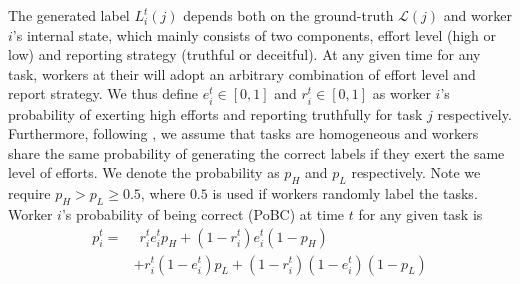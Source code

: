 The generated label $L^{t}_{i}(j)$ depends both on the ground-truth $\mathcal{L}(j)$ and worker $i$'s internal state, which mainly consists of two components, effort level (high or low) and reporting strategy (truthful or deceitful).
At any given time for any task, workers at their will adopt an arbitrary combination of effort level and report strategy. We thus define $e^{t}_i\in[0,1]$ and $r^{t}_i\in[0,1]$ as worker $i$'s probability of exerting high efforts and reporting truthfully for task $j$ %
respectively. Furthermore, following \citet{dasgupta2013crowdsourced,liu2017sequential}, we assume that tasks are homogeneous and workers share the same probability of generating the correct labels if they exert the same level of efforts. We denote the probability as $p_{H}$ and $p_{L}$ respectively. Note we require $p_{H} > p_{L} \geq 0.5$, where $0.5$ is used if workers randomly label the tasks. Worker $i$'s probability of being correct (PoBC) at time $t$ for any given task is 
\begin{equation}
\begin{split}
p^{t}_i  = &~~r^{t}_i e^{t}_i p_{H}+ (1-r^{t}_i) e^{t}_i (1-p_{ H})\\
&+r^{t}_i (1-e^{t}_i) p_{L}+(1-r^{t}_i) (1-e^{t}_i) (1-p_{L})
\end{split}
\end{equation}

